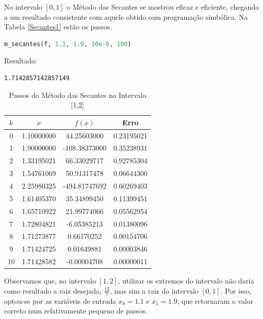 \documentclass{article}
\begin{document}
No intervalo $[0,1]$ o Método das Secantes se mostrou eficaz e eficiente, chegando a um resultado consistente com aquele obtido com programação simbólica. Na Tabela \ref{Secantes1} estão os passos.\\

\begin{lstlisting}[language=Python]
m_secantes(f, 1.1, 1.9, 10e-6, 100)
\end{lstlisting}

Resultado:
\begin{verbatim}
1.7142857142857149
\end{verbatim}

\begin{table}[ht!]
\vspace{-10pt}
\centering
\caption{Passos do Método das Secantes no Intervalo [1,2]}
\label{Secantes2}
\begin{tabular}{|c|c| c| c|}
\hline
$k$ & $x$ & $f(x)$ & Erro \\ \hline
0  & 1.10000000   & 44.25603000   & 0.23195021  \\ \hline
1  & 1.90000000   & -108.38373000 & 0.35238931  \\ \hline
2  & 1.33195021   & 66.33029717   & 0.92785304  \\ \hline
3  & 1.54761069   & 50.91317478   & 0.06644300  \\ \hline
4  & 2.25980325   & -494.81747692 & 0.60269403  \\ \hline
5  & 1.61405370   & 35.34899450   & 0.11399451  \\ \hline
6  & 1.65710922   & 21.99774066   & 0.05562954  \\ \hline
7  & 1.72804821   & -6.05385213   & 0.01380096  \\ \hline
8  & 1.71273877   & 0.66170252    & 0.00154706  \\ \hline
9  & 1.71424725   & 0.01649881    & 0.00003846  \\ \hline
10 & 1.71428582   & -0.00004708   & 0.00000011  \\ \hline
\end{tabular}
\end{table}

Observamos que, no intervalo $[1,2]$, utilizar os extremos do intervalo não daria como resultado a raiz desejada, $\frac{12}{7}$, mas sim a raiz do intervalo $[0,1]$. Por isso, optou-se por as variáveis de entrada $x_0=1.1$ e $x_1=1.9$, que retornaram o valor correto num relativamente pequeno de passos.
\end{document}
